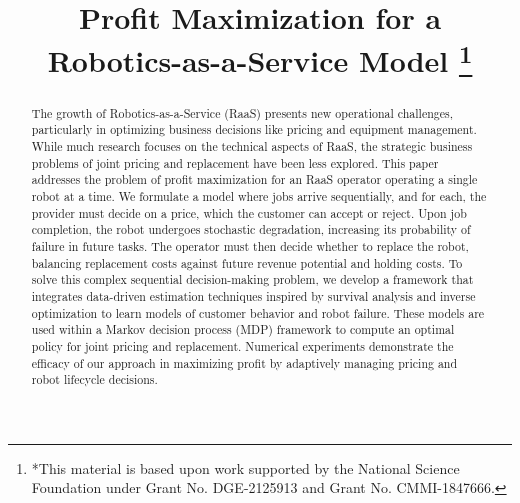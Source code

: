 \documentclass[conference]{IEEEtran}
\begin{document}
\title{Profit Maximization for a \\Robotics-as-a-Service Model
\thanks{*This material is based upon work supported by the National Science Foundation under Grant No. DGE-2125913 and Grant No. CMMI-1847666.}
}

\author{
\and
{}
}
\maketitle

\begin{abstract}
The growth of Robotics-as-a-Service (RaaS) presents new operational challenges, particularly in optimizing business decisions like pricing and equipment management. While much research focuses on the technical aspects of RaaS, the strategic business problems of joint pricing and replacement have been less explored. This paper addresses the problem of profit maximization for an RaaS operator operating a single robot at a time. We formulate a model where jobs arrive sequentially, and for each, the provider must decide on a price, which the customer can accept or reject. Upon job completion, the robot undergoes stochastic degradation, increasing its probability of failure in future tasks. The operator must then decide whether to replace the robot, balancing replacement costs against future revenue potential and holding costs. To solve this complex sequential decision-making problem, we develop a framework that integrates data-driven estimation techniques inspired by survival analysis and inverse optimization to learn models of customer behavior and robot failure. These models are used within a Markov decision process (MDP) framework to compute an optimal policy for joint pricing and replacement. Numerical experiments demonstrate the efficacy of our approach in maximizing profit by adaptively managing pricing and robot lifecycle decisions.

\end{abstract}
\end{document}
